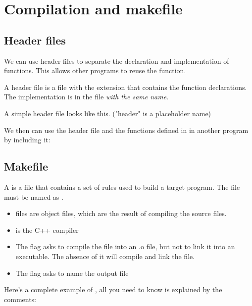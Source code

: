 \documentclass{article}
\begin{document}
\section{Compilation and makefile}
\subsection{Header files}
We can use header files to separate the declaration and implementation of functions. This allows other programs to reuse the function.

A header file is a file with the extension  that contains the function declarations. The implementation is in the  file \emph{with the same name}.

A simple header file looks like this. ("header" is a placeholder name)

We then can use the header file and the functions defined in  in another program by including it:


\subsection{Makefile}
A  is a file that contains a set of rules used to build a target program. The file must be named as .

\begin{itemize}
    \item {} files are object files, which are the result of compiling the source files.
    \item {} is the C++ compiler
    \item The  flag asks to compile the file into an .o file, but not to link it into an executable. The absence of it will compile and link the file.
    \item The  flag asks to name the output file
\end{itemize}

Here's a complete example of , all you need to know is explained by the comments:

\end{document}
